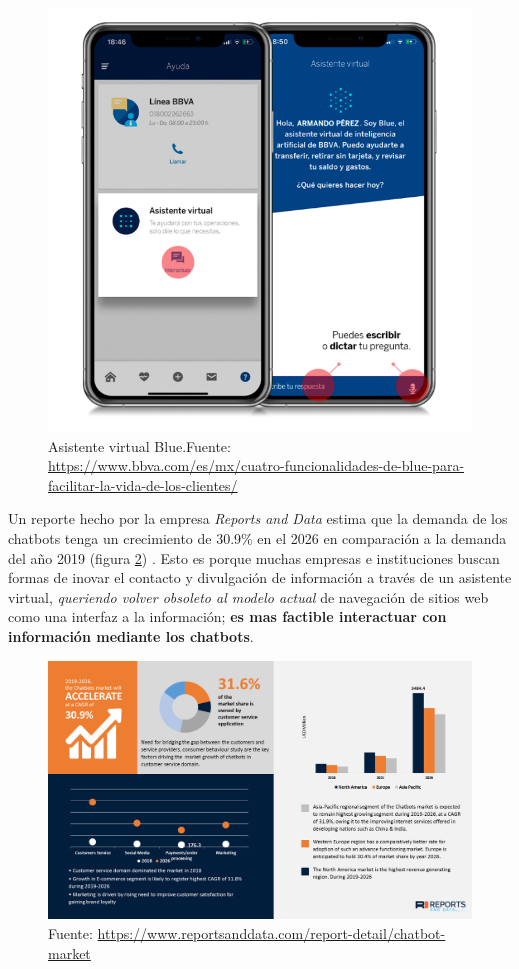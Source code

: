 \begin{figure}[ht]
    \centering
    \includegraphics[scale=0.375]{images/1/blue-bbva}
    \caption{Asistente virtual Blue.Fuente: \url{https://www.bbva.com/es/mx/cuatro-funcionalidades-de-blue-para-facilitar-la-vida-de-los-clientes/}}
    \label{fig:blue-bbva}
\end{figure}

Un reporte hecho por la empresa \textit{Reports and Data} estima que la demanda de los chatbots tenga un crecimiento de 30.9\% en el 2026 en comparación a la demanda del año 2019 (figura \ref{fig:demanda-chatbots}) . Esto es porque muchas empresas e instituciones buscan formas de inovar el contacto y divulgación de información a través de un asistente virtual, \textit{queriendo volver obsoleto al modelo actual} de navegación de sitios web como una interfaz a la información; \textbf{es mas factible interactuar con información mediante los chatbots}.

\begin{figure}[ht]
    \centering
    \includegraphics[scale=0.5]{images/1/demanda-chatbots}
    \caption{Fuente: \url{https://www.reportsanddata.com/report-detail/chatbot-market}}
    \label{fig:demanda-chatbots}
\end{figure}


